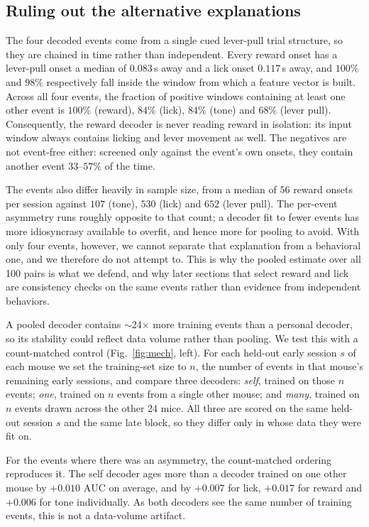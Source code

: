 \documentclass[mlmain,onecolumn]{jmlr}
\newcommand{\auc}{\mathrm{AUC}}
\begin{document}
\subsection{Ruling out the alternative explanations}
\label{sec:events}
\label{sec:matched}
\label{sec:scaling}
The four decoded events come from a single cued lever-pull trial structure, so they are chained in
time rather than independent. Every reward onset has a lever-pull onset a median of $0.083$\,s away
and a lick onset $0.117$\,s away, and $100\%$ and $98\%$ respectively fall inside the window from
which a feature vector is built. Across all four events, the fraction of positive windows containing
at least one other event is $100\%$ (reward), $84\%$ (lick), $84\%$ (tone) and $68\%$ (lever pull).
Consequently, the reward decoder is never reading reward in isolation: its input window always
contains licking and lever movement as well. The negatives are not event-free either: screened only against
the event's own onsets, they contain another event $33$--$57\%$ of the time.

The events also differ heavily in sample size, from a median of $56$ reward onsets per session
against $107$ (tone), $530$ (lick) and $652$ (lever pull). The per-event asymmetry runs roughly
opposite to that count; a decoder fit to fewer events has more idiosyncrasy available to overfit, and
hence more for pooling to avoid. With only four events, however, we cannot separate that explanation from a
behavioral one, and we therefore do not attempt to. This is why the pooled estimate over all 100 pairs is what we defend, and
why later sections that select reward and lick are consistency checks on the same events rather than
evidence from independent behaviors.

A pooled decoder contains $\sim$24$\times$ more training events than a personal decoder, so its
stability could reflect data volume rather than pooling. We test this with a count-matched control
(Fig.~\ref{fig:mech}, left). For each held-out early session $s$ of each mouse we set the
training-set size to $n$, the number of events in that mouse's remaining early sessions, and compare
three decoders: \emph{self}, trained on those $n$ events; \emph{one}, trained on $n$ events from a
single other mouse; and \emph{many}, trained on $n$ events drawn across the other 24 mice. All three
are scored on the same held-out session $s$ and the same late block, so they differ only in whose
data they were fit on.

For the events where there was an asymmetry, the count-matched ordering reproduces it. The self
decoder ages more than a decoder trained on one other mouse by $+0.010$ $\auc$ on average, and by
$+0.007$ for lick, $+0.017$ for reward and $+0.006$ for tone individually. As both decoders see the
same number of training events, this is not a data-volume artifact.
\end{document}
